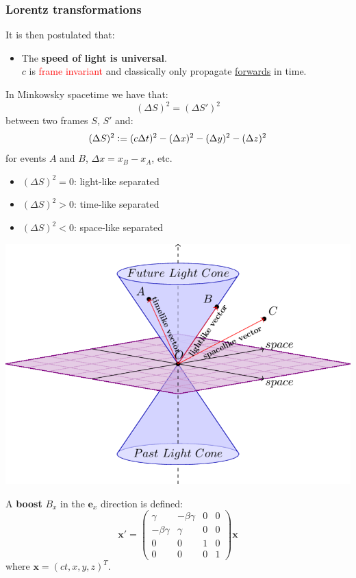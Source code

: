 \documentclass{article}
\newcommand{\deq}{\vcentcolon=}
\newcommand{\vc}[1]{\boldsymbol{#1}}
\begin{document}
\begin{multicols*}{3}
\subsubsection*{Lorentz transformations}
It is then postulated that:
\begin{itemize}
    \item The \textbf{speed of light is universal}. \\
    $c$ is \textcolor{red}{frame invariant} and classically
    only propagate \underline{forwards} in time.
\end{itemize}
In Minkowsky spacetime we have that:
$$(\Delta S)^2=(\Delta S')^2$$
between two frames $S$, $S'$ and:
$$(\Delta S)^2\deq(c\Delta t)^2-(\Delta x)^2
-(\Delta y)^2-(\Delta z)^2$$
for events $A$ and $B$, $\Delta x=x_B-x_A$, etc.
\begin{itemize}
    \item $(\Delta S)^2=0$: light-like separated
    \item $(\Delta S)^2>0$: time-like separated
    \item $(\Delta S)^2<0$: space-like separated
\end{itemize}
\begin{center}
    \includegraphics[scale=0.6]{f12.png}
\end{center}
A \textbf{boost} $B_x$ in the $\vc{e}_x$ direction is defined:
$$\vc{x}'=\begin{pmatrix}\gamma & -\beta\gamma & 0 & 0 \\
-\beta\gamma & \gamma & 0 & 0 \\ 0 & 0 & 1 & 0 \\ 0 & 0 & 0 & 1
\end{pmatrix}\vc{x}$$
where $\vc{x}=(ct,x,y,z)^T$.


\end{multicols*}
\end{document}
